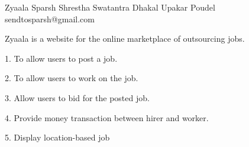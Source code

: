  \begin{conf-abstract}[]
 {Zyaala}
 {Sparsh Shrestha
 	 Swatantra Dhakal
 	  Upakar Poudel
 }
{sendtosparsh@gmail.com}

Zyaala is a website for the online marketplace of outsourcing jobs.

1.    To allow users to post a job.

2.    To allow users to work on the job.

3.    Allow users to bid for the posted job.

4.    Provide money transaction between hirer and worker.

5.    Display location-based job
 \end{conf-abstract}
